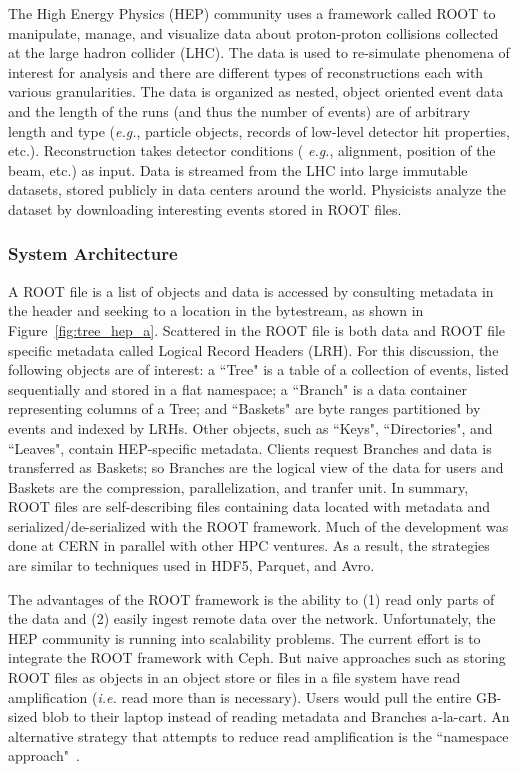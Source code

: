 The High Energy Physics (HEP) community uses a framework called ROOT to
manipulate, manage, and visualize data about proton-proton collisions collected
at the large hadron collider (LHC). The data is used to re-simulate phenomena
of interest for analysis and there are different types of reconstructions each
with various granularities. The data is organized as nested, object oriented
event data and the length of the runs (and thus the number of events) are of
arbitrary length and type ({\it e.g.}, particle objects, records of low-level
detector hit properties, etc.).  Reconstruction takes detector conditions ({\it
e.g.}, alignment, position of the beam, etc.) as input.  Data is streamed from
the LHC into large immutable datasets, stored publicly in data centers around
the world.  Physicists analyze the dataset by downloading interesting events
stored in ROOT files.

\subsubsection{System Architecture}

A ROOT file is a list of objects and data is accessed by consulting metadata in
the header and seeking to a location in the bytestream, as shown in
Figure~\ref{fig:tree_hep_a}. Scattered in the ROOT file is both data and ROOT
file specific metadata called Logical Record Headers (LRH).  For this
discussion, the following objects are of interest: a ``Tree" is a table of a
collection of events, listed sequentially and stored in a flat namespace; a
``Branch" is a data container representing columns of a Tree; and ``Baskets"
are byte ranges partitioned by events and indexed by LRHs.  Other objects, such
as ``Keys", ``Directories", and ``Leaves", contain HEP-specific metadata.
Clients request Branches and data is transferred as Baskets; so Branches are
the logical view of the data for users and Baskets are the compression,
parallelization, and tranfer unit. In summary, ROOT files are self-describing
files containing data located with metadata and serialized/de-serialized with
the ROOT framework.  Much of the development was done at CERN in parallel with
other HPC ventures. As a result, the strategies are similar to techniques used
in HDF5, Parquet, and Avro.

The advantages of the ROOT framework is the ability to (1) read only parts of
the data and (2) easily ingest remote data over the network.  Unfortunately,
the HEP community is running into scalability problems.  The current effort is
to integrate the ROOT framework with Ceph. But naive approaches such as storing
ROOT files as objects in an object store or files in a file system have read
amplification ({\it i.e.} read more than is necessary). Users would pull the
entire GB-sized blob to their laptop instead of reading metadata and Branches
a-la-cart. An alternative strategy that attempts to reduce read amplification
is the ``namespace approach"~\cite{pivarski:indico17-root}.

